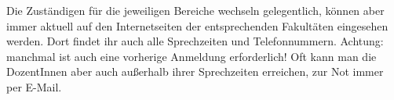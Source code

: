 \noindent Die Zuständigen für die jeweiligen Bereiche wechseln gelegentlich, können aber immer
aktuell auf den Internetseiten der entsprechenden Fakultäten eingesehen werden. Dort
findet ihr auch alle Sprechzeiten und Telefonnummern. Achtung: manchmal ist auch
eine vorherige Anmeldung erforderlich! Oft kann man die DozentInnen aber auch
außerhalb ihrer Sprechzeiten erreichen, zur Not immer per E-Mail.\\[.9cm]

\relax

\iftrue
\checkoddpage
\ifoddpage
    \hspace*{-1.15cm}
\else
    \hspace*{-5.52cm}
\fi
\begin{minipage}{1.51\textwidth}
\parbox [t]{0.3\textwidth}{
    \ifdefined\prodekanmathefoto
    \fi
}
\hfill
\parbox[t]{0.3\textwidth}{
    \ifdefined\prodekanphysikfotoA
    \fi
}
\hfill
\parbox [t]{0.3\textwidth}{
    \ifdefined\prodekanphysikfotoB
    \fi
}
\end{minipage}
\else
\checkoddpage
\ifoddpage
    \hspace*{-1.695cm}
\else
    \hspace*{-4.55cm}
\fi
